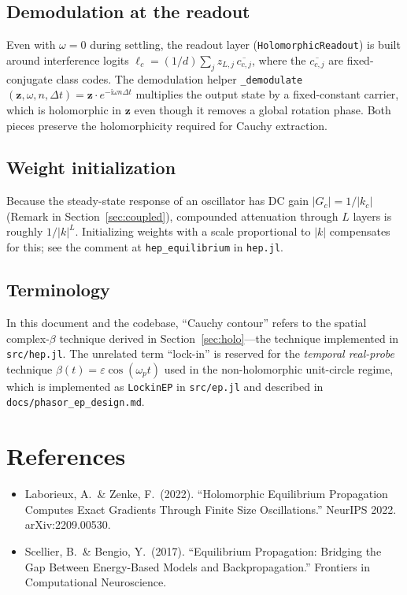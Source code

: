 \documentclass[11pt]{article}
\newcommand{\im}{\mathrm{i}}
\newcommand{\dt}{\Delta t}
\theoremstyle{definition}
\begin{document}
\subsection{Demodulation at the readout}

Even with $\omega=0$ during settling, the readout layer
(\texttt{HolomorphicReadout}) is built around interference logits
$\ell_c = (1/d)\sum_j z_{L,j}\,\overline{c_{c,j}}$, where the
$\overline{c_{c,j}}$ are fixed-conjugate class codes.  The
demodulation helper \texttt{\_demodulate}$(\bm{z},\omega,n,\dt) =
\bm{z}\cdot e^{-\im\omega n\dt}$ multiplies the output state by a
fixed-constant carrier, which is holomorphic in $\bm{z}$ even though
it removes a global rotation phase.  Both pieces preserve the
holomorphicity required for Cauchy extraction.

\subsection{Weight initialization}

Because the steady-state response of an oscillator has DC gain
$|G_c|=1/|k_c|$ (Remark in Section~\ref{sec:coupled}), compounded
attenuation through $L$ layers is roughly $1/|k|^L$.  Initializing
weights with a scale proportional to $|k|$ compensates for this; see
the comment at \texttt{hep\_equilibrium} in \texttt{hep.jl}.

\subsection{Terminology}

In this document and the codebase, ``Cauchy contour'' refers to the
spatial complex-$\beta$ technique derived in
Section~\ref{sec:holo}---the technique implemented in
\texttt{src/hep.jl}.  The unrelated term ``lock-in'' is reserved for
the \emph{temporal real-probe} technique
$\beta(t) = \varepsilon\cos(\omega_p t)$ used in the non-holomorphic
unit-circle regime, which is implemented as \texttt{LockinEP} in
\texttt{src/ep.jl} and described in
\texttt{docs/phasor\_ep\_design.md}.

\section*{References}

\begin{itemize}
\item Laborieux, A.\ \& Zenke, F.\ (2022).
  ``Holomorphic Equilibrium Propagation Computes Exact Gradients
  Through Finite Size Oscillations.'' NeurIPS 2022.
  arXiv:2209.00530.
\item Scellier, B.\ \& Bengio, Y.\ (2017).
  ``Equilibrium Propagation: Bridging the Gap Between Energy-Based
  Models and Backpropagation.''
  Frontiers in Computational Neuroscience.
\end{itemize}
\end{document}
